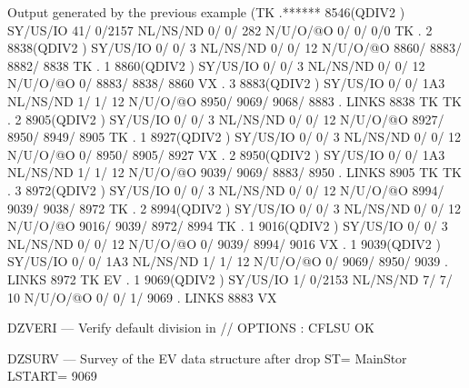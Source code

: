 \begin{Listing}{Output generated by the previous example}
(TK  .******     8546(QDIV2   ) SY/US/IO   41/    0/2157 NL/NS/ND    0/    0/     282 N/U/O/@O       0/       0/       0/0       
 TK  .     2     8838(QDIV2   ) SY/US/IO    0/    0/   3 NL/NS/ND    0/    0/      12 N/U/O/@O    8860/    8883/    8882/    8838
 TK  .     1     8860(QDIV2   ) SY/US/IO    0/    0/   3 NL/NS/ND    0/    0/      12 N/U/O/@O       0/    8883/    8838/    8860
 VX  .     3     8883(QDIV2   ) SY/US/IO    0/    0/ 1A3 NL/NS/ND    1/    1/      12 N/U/O/@O    8950/    9069/    9068/    8883
     . LINKS      8838 TK                                                                                                        
 TK  .     2     8905(QDIV2   ) SY/US/IO    0/    0/   3 NL/NS/ND    0/    0/      12 N/U/O/@O    8927/    8950/    8949/    8905
 TK  .     1     8927(QDIV2   ) SY/US/IO    0/    0/   3 NL/NS/ND    0/    0/      12 N/U/O/@O       0/    8950/    8905/    8927
 VX  .     2     8950(QDIV2   ) SY/US/IO    0/    0/ 1A3 NL/NS/ND    1/    1/      12 N/U/O/@O    9039/    9069/    8883/    8950
     . LINKS      8905 TK                                                                                                        
 TK  .     3     8972(QDIV2   ) SY/US/IO    0/    0/   3 NL/NS/ND    0/    0/      12 N/U/O/@O    8994/    9039/    9038/    8972
 TK  .     2     8994(QDIV2   ) SY/US/IO    0/    0/   3 NL/NS/ND    0/    0/      12 N/U/O/@O    9016/    9039/    8972/    8994
 TK  .     1     9016(QDIV2   ) SY/US/IO    0/    0/   3 NL/NS/ND    0/    0/      12 N/U/O/@O       0/    9039/    8994/    9016
 VX  .     1     9039(QDIV2   ) SY/US/IO    0/    0/ 1A3 NL/NS/ND    1/    1/      12 N/U/O/@O       0/    9069/    8950/    9039
     . LINKS      8972 TK                                                                                                        
 EV  .     1     9069(QDIV2   ) SY/US/IO    1/    0/2153 NL/NS/ND    7/    7/      10 N/U/O/@O       0/       0/       1/    9069
     . LINKS      8883 VX                                                                                                        
                                                                                                                                 
DZVERI --- Verify default division in //                                                           OPTIONS : CFLSU          OK   
                                                                                                                                 
DZSURV --- Survey of the EV data structure after drop                                              ST= MainStor  LSTART=     9069
                                                                                                                                 

\end{Listing}
